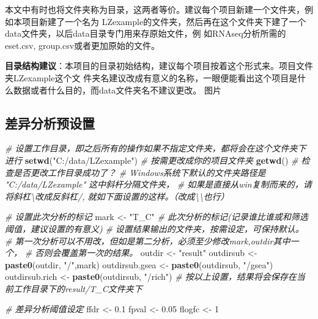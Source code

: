 \documentclass[
]{book}
\newenvironment{Shaded}{\begin{snugshade}}{\end{snugshade}}
\newcommand{\CommentTok}[1]{\textcolor[rgb]{0.56,0.35,0.01}{\textit{#1}}}
\newcommand{\DecValTok}[1]{\textcolor[rgb]{0.00,0.00,0.81}{#1}}
\newcommand{\FloatTok}[1]{\textcolor[rgb]{0.00,0.00,0.81}{#1}}
\newcommand{\FunctionTok}[1]{\textcolor[rgb]{0.13,0.29,0.53}{\textbf{#1}}}
\newcommand{\NormalTok}[1]{#1}
\newcommand{\OtherTok}[1]{\textcolor[rgb]{0.56,0.35,0.01}{#1}}
\newcommand{\StringTok}[1]{\textcolor[rgb]{0.31,0.60,0.02}{#1}}
\begin{document}
本文中有时也将文件夹称为目录，这两者等价。建议每个项目新建一个文件夹，例如本项目新建了一个名为
LZexample的文件夹，然后再在这个文件夹下建了一个data文件夹，以后data目录专门用来存原始文件，例
如RNAseq分析所需的eset.csv, group.csv或者更加原始的文件。

\textbf{目录结构建议}：本项目的目录初始结构，建议每个项目按着这个形式来。项目文件夹LZexample这个文
件夹名建议改成有意义的名称，一眼便能看出这个项目是什么数据或者什么目的，而data文件夹名不建议更改。
图片

\subsection{差异分析预设置}\label{ux5deeux5f02ux5206ux6790ux9884ux8bbeux7f6e}

\begin{Shaded}
\begin{Highlighting}[]
\CommentTok{\# 设置工作目录，即之后所有的操作如果不指定文件夹，都将会在这个文件夹下进行}
\FunctionTok{setwd}\NormalTok{(}\StringTok{"C:/data/LZexample"}\NormalTok{)  }\CommentTok{\# 按需更改成你的项目文件夹}
\FunctionTok{getwd}\NormalTok{() }\CommentTok{\# 检查是否更改工作目录成功了？}
\CommentTok{\# Windows系统下默认的文件夹路径是 "C:/data/LZexample" 这中斜杆分隔文件夹，}
\CommentTok{\# 如果是直接从win复制而来的，请将斜杠\textbackslash{}改成反斜杠/, 就如下面设置的这样。（改成\textbackslash{}\textbackslash{}也行）}

\CommentTok{\# 设置此次分析的标记}
\NormalTok{mark }\OtherTok{\textless{}{-}} \StringTok{"T\_C"}  \CommentTok{\# 此次分析的标记(记录谁比谁或和筛选阈值，建议设置的有意义)}
\CommentTok{\# 设置结果输出的文件夹，按需设定，可保持默认。}
\CommentTok{\#  第一次分析可以不用改，但如是第二分析，必须至少修改mark,outdir其中一个，}
\CommentTok{\#  否则会覆盖第一次的结果。}
\NormalTok{outdir }\OtherTok{\textless{}{-}} \StringTok{"result"}  
\NormalTok{outdirsub }\OtherTok{\textless{}{-}} \FunctionTok{paste0}\NormalTok{(outdir, }\StringTok{"/"}\NormalTok{,mark)}
\NormalTok{outdirsub.gsea }\OtherTok{\textless{}{-}} \FunctionTok{paste0}\NormalTok{(outdirsub, }\StringTok{"/gsea"}\NormalTok{)}
\NormalTok{outdirsub.rich }\OtherTok{\textless{}{-}} \FunctionTok{paste0}\NormalTok{(outdirsub, }\StringTok{"/rich"}\NormalTok{)}
\CommentTok{\# 按以上设置，结果将会保存在当前工作目录下的result/T\_C文件夹下}

\CommentTok{\# 差异分析阈值设定}
\NormalTok{ffdr }\OtherTok{\textless{}{-}} \FloatTok{0.1}
\NormalTok{fpval }\OtherTok{\textless{}{-}} \FloatTok{0.05}
\NormalTok{flogfc }\OtherTok{\textless{}{-}} \DecValTok{1}
\end{Highlighting}
\end{Shaded}
\end{document}
